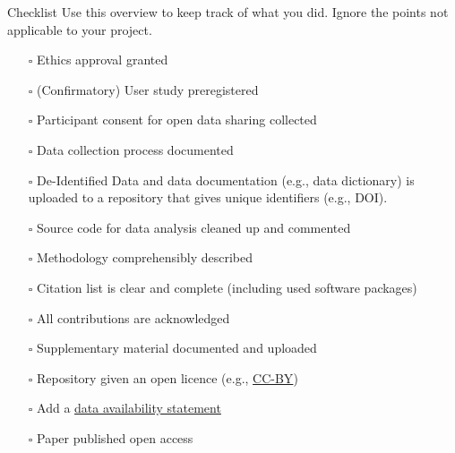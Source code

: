 
\begin{block}{Checklist}
Use this overview to keep track of what you did. Ignore the points not applicable to your project.
\begin{itemize}
\item[$\square$]
Ethics approval granted
\item[$\square$]
(Confirmatory) User study preregistered
\item[$\square$]
Participant consent for open data sharing collected
\item[$\square$]
Data collection process documented
\item[$\square$]
De-Identified Data and data documentation (e.g., data dictionary) is uploaded to a repository that gives unique identifiers (e.g., DOI).

\item[$\square$]
Source code for data analysis cleaned up and commented
\item[$\square$]
Methodology comprehensibly described
\item[$\square$]
Citation list is clear and complete (including used software packages)
\item[$\square$]
All contributions are acknowledged

\item[$\square$]
Supplementary material documented and uploaded
\item[$\square$]
Repository given an open licence (e.g., \href{https://creativecommons.org/licenses/by/4.0/}{CC-BY})
\item[$\square$] Add a \href{https://www.cambridge.org/core/services/authors/open-data/data-availability-statements}{data availability statement}
\item[$\square$]
Paper published open access 
\end{itemize}
\end{block}

